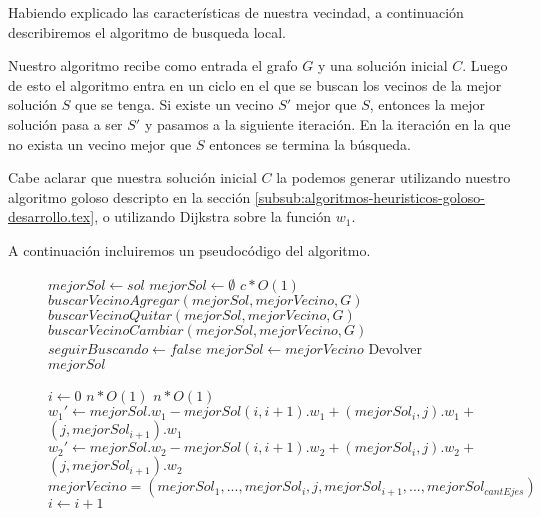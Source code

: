 Habiendo explicado las características de nuestra vecindad, a continuación describiremos el algoritmo de busqueda local.

Nuestro algoritmo recibe como entrada el grafo $G$ y una solución inicial $C$. Luego de esto el algoritmo entra en un ciclo en el que se buscan los vecinos de la mejor solución $S$ que se tenga. Si existe un vecino $S'$ mejor que $S$, entonces la mejor solución pasa a ser $S'$ y pasamos a la siguiente iteración. En la iteración en la que no exista un vecino mejor que $S$ entonces se termina la búsqueda.

Cabe aclarar que nuestra solución inicial $C$ la podemos generar utilizando nuestro algoritmo goloso descripto en la sección \ref{subsub:algoritmos-heuristicos-goloso-desarrollo.tex}, o utilizando Dijkstra sobre la función $w_1$.

A continuación incluiremos un pseudocódigo del algoritmo.
\begin{center}
 \begin{figure}[H]
  \begin{pseudo}
   \State $mejorSol \leftarrow sol$
   \State $mejorSol \leftarrow \emptyset $
   \hfill$c*O(1)$
      \State $buscarVecinoAgregar(mejorSol, mejorVecino, G)$
      \State $buscarVecinoQuitar(mejorSol, mejorVecino, G)$
      \State $buscarVecinoCambiar(mejorSol, mejorVecino, G)$
	\State $seguirBuscando \leftarrow false$
      \Else
	\State $mejorSol \leftarrow mejorVecino$
      \EndIf
   \EndWhile
   \State Devolver $mejorSol$
   \EndProcedure
  \end{pseudo}
 \end{figure}
\end{center}

\begin{flushleft}
 \begin{figure}[H]
  \begin{pseudo}
   \State $i \leftarrow 0$
   \hfill$n*O(1)$
      \hfill$n*O(1)$
	  \State $w_1' \leftarrow mejorSol.w_1 - mejorSol(i,i+1).w_1 + (mejorSol_i,j).w_1 + $
	  \State $(j,mejorSol_{i+1}).w_1$
	  \State $w_2' \leftarrow mejorSol.w_2 - mejorSol(i,i+1).w_2 + (mejorSol_i,j).w_2 + $
	  \State $(j,mejorSol_{i+1}).w_2$
	    \State $mejorVecino = (mejorSol_1, ... ,mejorSol_i, j, mejorSol_{i+1}, ..., mejorSol_{cantEjes})$
	  \EndIf
      \EndFor
      \State $i \leftarrow i+1$
   \EndWhile
   \EndProcedure
  \end{pseudo}
 \end{figure}
\end{flushleft}

